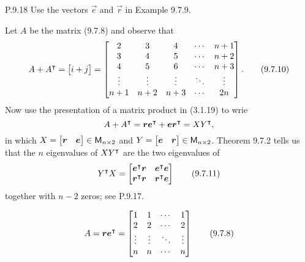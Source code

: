 \documentclass{../homework}
\begin{document}
\begin{problems}
\begin{enumerate}
\begin{solution}
    \end{solution}
  \end{enumerate}
\item[P.9.18] Use the vectors \(\vec e\) and \(\vec r\) in Example
  9.7.9.
  \begin{bookexample}[9.7.9]
    Let \(A\) be the matrix (9.7.8) and observe that
    \[
      A + A^\intercal = \begin{bmatrix} i+j \end{bmatrix}
      =
      \begin{bmatrix}
        2 & 3 & 4 & \cdots & n+1 \\
        3 & 4 & 5 & \cdots & n+2 \\
        4 & 5 & 6 & \cdots & n+3 \\
        \vdots & \vdots & \vdots & \ddots & \vdots \\
        n+1 & n+2 & n+3 & \cdots & 2n
      \end{bmatrix}.
      \tag{9.7.10}
    \]
    Now use the presentation of a matrix product in (3.1.19) to wrie
    \[
      A + A^\transpose = \vec r \vec e^\transpose
      + \vec e \vec r^\transpose = XY^\transpose,
    \]
    in which
    \(X = \begin{bmatrix} \vec r & \vec e \end{bmatrix} \in \M_{n
      \times 2}\) and
    \(Y = \begin{bmatrix} \vec e & \vec r \end{bmatrix} \in \M_{n
      \times 2}\).  Theorem 9.7.2 tells us that the \(n\) eigenvalues
    of \(XY^\intercal\) are the two eigenvalues of
    \[
      Y^\transpose X =
      \begin{bmatrix}
        \vec e^\transpose \vec r & \vec e^\transpose \vec e \\
        \vec r^\transpose \vec r & \vec r^\transpose \vec e \\
      \end{bmatrix}
      \tag{9.7.11}
    \]
    together with \(n-2\) zeros; see P.9.17.
  \end{bookexample}

  \begin{book}
    \[
      A = \vec r \vec e^\transpose =
      \begin{bmatrix}
        1 & 1 & \cdots & 1 \\
        2 & 2 & \cdots & 2 \\
        \vdots & \vdots & \ddots & \vdots \\
        n & n & \cdots & n
      \end{bmatrix}
      \tag{9.7.8}
    \]
  \end{book}


\end{problems}
\end{document}
